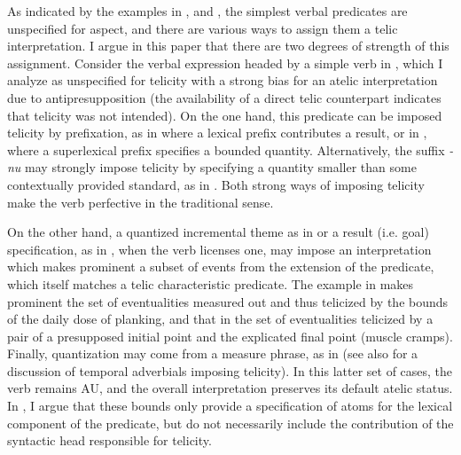 \documentclass[output=paper]{langscibook}
\begin{document}
\noindent As indicated by the examples in ,  and , the simplest verbal predicates are unspecified for aspect, and there are various ways to assign them a telic interpretation. I argue in this paper that there are two degrees of strength of this assignment. Consider the verbal expression headed by a simple verb in , which I analyze as unspecified for telicity with a strong bias for an atelic interpretation due to antipresupposition (the availability of a direct telic counterpart indicates that telicity was not intended). On the one hand, this predicate can be imposed telicity by prefixation, as in  where a lexical prefix contributes a result, or in , where a superlexical prefix specifies a bounded quantity. Alternatively, the suffix \textit{-nu} may strongly impose telicity by specifying a quantity smaller than some contextually provided standard, as in . Both strong ways of imposing telicity make the verb perfective in the traditional sense. 

On the other hand, a quantized incremental theme as in  or a result (i.e. goal) specification, as in  , when the verb licenses one, may impose an interpretation which makes prominent a subset of events from the extension of the predicate, which itself matches a telic characteristic predicate. The example in  makes prominent the set of eventualities measured out and thus telicized by the bounds of the daily dose of planking, and that in  the set of eventualities telicized by a pair of a presupposed initial point and the explicated final point (muscle cramps). Finally, quantization may come from a measure phrase, as in  (see also \citealt{Pereltsvaig.2000, Szucsich.2001, chapters/10-Milosavljevic, Milosav.dis} for a discussion of temporal adverbials imposing telicity). In this latter set of cases, the verb remains AU, and the overall interpretation preserves its default atelic status. In , I argue that these bounds only provide a specification of atoms for the lexical component of the predicate, but do not necessarily include the contribution of the syntactic head responsible for telicity.\largerpage[2]
\end{document}
